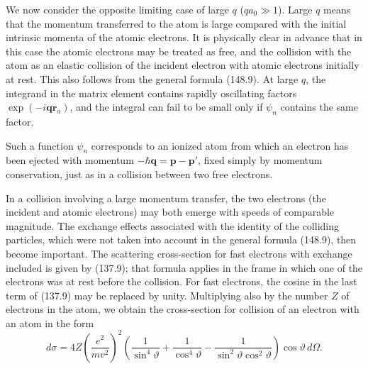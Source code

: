 We now consider the opposite limiting case of large $q$ ($qa_0\gg1$). Large
$q$ means that the momentum transferred to the atom is large compared with
the initial intrinsic momenta of the atomic electrons. It is physically clear
in advance that in this case the atomic electrons may be treated as free, and
the collision with the atom as an elastic collision of the incident electron
with atomic electrons initially at rest. This also follows from the general
formula (148.9). At large $q$, the integrand in the matrix element contains
rapidly oscillating factors $\exp(-i\mathbf q\mathbf r_a)$, and the integral
can fail to be small only if $\psi_n$ contains the same factor.

Such a function $\psi_n$ corresponds to an ionized atom from which an electron
has been ejected with momentum $-\hbar\mathbf q=\mathbf p-\mathbf p'$, fixed
simply by momentum conservation, just as in a collision between two free
electrons.

In a collision involving a large momentum transfer, the two electrons (the
incident and atomic electrons) may both emerge with speeds of comparable
magnitude. The exchange effects associated with the identity of the colliding
particles, which were not taken into account in the general formula (148.9),
then become important. The scattering cross-section for fast electrons with
exchange included is given by (137.9); that formula applies in the frame in
which one of the electrons was at rest before the collision. For fast
electrons, the cosine in the last term of (137.9) may be replaced by unity.
Multiplying also by the number $Z$ of electrons in the atom, we obtain the
cross-section for collision of an electron with an atom in the form
\begin{equation}
 d\sigma=4Z\left(\frac{e^2}{mv^2}\right)^2
 \left(\frac1{\sin^4\vartheta}+\frac1{\cos^4\vartheta}
 -\frac1{\sin^2\vartheta\cos^2\vartheta}\right)\cos\vartheta\,d\Omega.
 \tag{148.16}
\end{equation}

